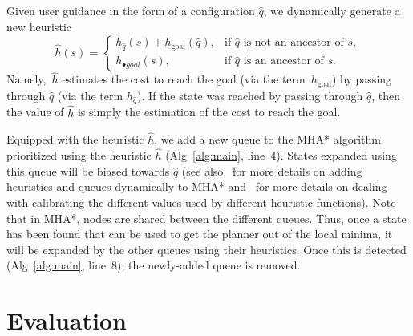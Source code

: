 \documentclass[conference]{IEEEtran}
\begin{document}
Given user guidance in the form of a configuration $\hat{q}$, we dynamically generate a new heuristic $$
    \hat{h}(s)= 
\begin{cases}
    h_{\hat{q}}(s) + h_{\text{goal}}(\hat{q}),	& 
    		\text{if } \hat{q} \text{ is not an ancestor of } s,\\
    h_{\textbf{•}{goal}}(s),            		& 
    		\text{if } \hat{q} \text{ is an ancestor of } s.
\end{cases}
$$
Namely,~$\hat{h}$ estimates the 
cost to reach the goal (via the term~$h_{\text{goal}}$) by passing through $\hat{q}$ (via the term $h_{\hat{q}}$). If the state was reached by passing through $\hat{q}$, then the value of $\hat{h}$ is simply the estimation of the cost to reach the goal.


Equipped with the heuristic $\hat{h}$, we add a new queue to the MHA* algorithm prioritized using the heuristic $\hat{h}$ (Alg~\ref{alg:main}, line~4). 
States expanded using this queue will be biased towards $\hat{q}$ (see also~\cite{INL15} for more details on adding heuristics and queues dynamically to MHA*
and~\cite{NAL15} for more details on dealing with calibrating the different values used by different heuristic functions).
Note that in MHA*, nodes are shared between the different queues.
Thus, once a state has been found that can be used to get the planner out of the local minima, it will be expanded by the other queues using their heuristics.
Once this is detected (Alg~\ref{alg:main}, line~8), the newly-added queue is removed.


\section{Evaluation }
\label{sec:eval}
\end{document}
